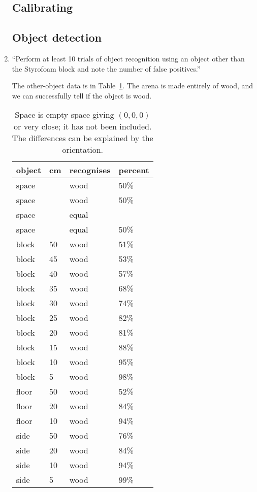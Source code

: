 \documentclass[twocolumn]{article}
\begin{document}
\begin{enumerate}

\subsection{Calibrating}









\subsection{Object detection}

\item
``Perform at least 10 trials of object recognition using an object other than the Styrofoam block and note the number of false positives.\cite{lab5}''

The other-object data is in Table~\ref{wood}. The arena is made entirely of wood, and we can successfully tell if the object is wood.

\begin{table}[htb]\footnotesize
\begin{center}\begin{tabular}{llll}
object& cm& recognises& percent \\
\hline
space&   & wood& 50\% \\
space&   & wood& 50\% \\
space&   & equal& \\
space&   & equal& 50\% \\
\hline
block& 50& wood& 51\% \\
block& 45& wood& 53\% \\
block& 40& wood& 57\% \\
block& 35& wood& 68\% \\
block& 30& wood& 74\% \\
block& 25& wood& 82\% \\
block& 20& wood& 81\% \\
block& 15& wood& 88\% \\
block& 10& wood& 95\% \\
block&  5& wood& 98\% \\
floor& 50& wood& 52\% \\
floor& 20& wood& 84\% \\
floor& 10& wood& 94\% \\
side& 50& wood& 76\% \\
side& 20& wood& 84\% \\
side& 10& wood& 94\% \\
side&  5& wood& 99\% \\
\end{tabular}\end{center}
\caption{Space is empty space giving $(0,0,0)$ or very close;
it has not been included. The differences can be explained by the orientation.}
\label{wood}
\end{table}


\end{enumerate}
\end{document}
